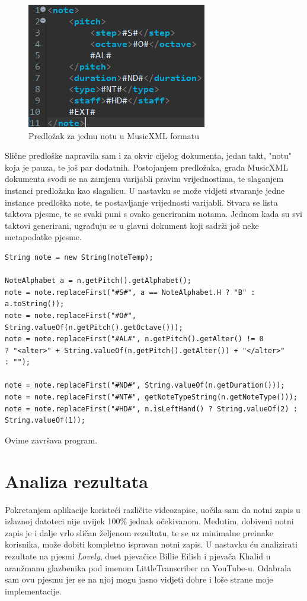 \documentclass[times, utf8, zavrsni, numeric]{fer}
\begin{document}
\begin{figure}[h]
	\includegraphics[scale=1.2]{notexml.png}
	\centering
	\caption{Predložak za jednu notu u MusicXML formatu}
	\label{fig:notexml}
\end{figure}

Slične predloške napravila sam i za okvir cijelog dokumenta, jedan takt, "notu" koja je pauza, te još par dodatnih. Postojanjem predložaka, građa MusicXML dokumenta svodi se na zamjenu varijabli pravim vrijednostima, te slaganjem instanci predložaka kao slagalicu. U nastavku se može vidjeti stvaranje jedne instance predloška note, te postavljanje vrijednosti varijabli. Stvara se lista taktova pjesme, te se svaki puni s ovako generiranim notama. Jednom kada su svi taktovi generirani, ugrađuju se u glavni dokument koji sadrži još neke metapodatke pjesme.

\begin{lstlisting}
String note = new String(noteTemp);

NoteAlphabet a = n.getPitch().getAlphabet();
note = note.replaceFirst("#S#", a == NoteAlphabet.H ? "B" : a.toString());
note = note.replaceFirst("#O#", String.valueOf(n.getPitch().getOctave()));
note = note.replaceFirst("#AL#", n.getPitch().getAlter() != 0
? "<alter>" + String.valueOf(n.getPitch().getAlter()) + "</alter>"
: "");

note = note.replaceFirst("#ND#", String.valueOf(n.getDuration()));
note = note.replaceFirst("#NT#", getNoteTypeString(n.getNoteType()));
note = note.replaceFirst("#HD#", n.isLeftHand() ? String.valueOf(2) : String.valueOf(1));
\end{lstlisting}

Ovime završava program.

\chapter{Analiza rezultata}
Pokretanjem aplikacije koristeći različite videozapise, uočila sam da notni zapis u izlaznoj datoteci nije uvijek 100\% jednak očekivanom. Međutim, dobiveni notni zapis je i dalje vrlo sličan željenom rezultatu, te se uz minimalne preinake korisnika, može dobiti kompletno ispravan notni zapis. U nastavku ću analizirati rezultate na pjesmi \textit{Lovely}, duet pjevačice Billie Eilish i pjevača Khalid u aranžmanu glazbenika pod imenom LittleTranscriber na YouTube-u\cite{lovely}. Odabrala sam ovu pjesmu jer se na njoj mogu jasno vidjeti dobre i loše strane moje implementacije.\\
\end{document}
